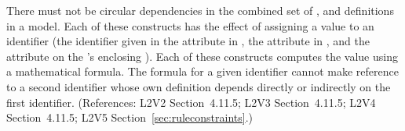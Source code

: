 There must not be circular dependencies in the combined set of
\InitialAssignment, \AssignmentRule and \KineticLaw definitions in a model.
Each of these constructs has the effect of assigning a value to an
identifier (\ie the identifier given in the attribute  in
\InitialAssignment, the attribute  in \AssignmentRule, and the
attribute  on the \KineticLaw's enclosing \Reaction).  Each of these
constructs computes the value using a mathematical formula.  The formula
for a given identifier cannot make reference to a second identifier whose
own definition depends directly or indirectly on the first identifier.
(References: L2V2 Section~4.11.5; L2V3 Section~4.11.5; L2V4 Section~4.11.5; L2V5 Section~\ref{sec:ruleconstraints}.)
